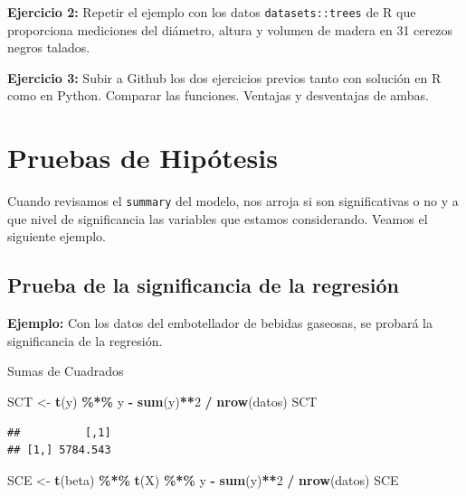 \documentclass[
]{book}
\newenvironment{Shaded}{\begin{snugshade}}{\end{snugshade}}
\newcommand{\DecValTok}[1]{\textcolor[rgb]{0.00,0.00,0.81}{#1}}
\newcommand{\FunctionTok}[1]{\textcolor[rgb]{0.13,0.29,0.53}{\textbf{#1}}}
\newcommand{\NormalTok}[1]{#1}
\newcommand{\OtherTok}[1]{\textcolor[rgb]{0.56,0.35,0.01}{#1}}
\newcommand{\SpecialCharTok}[1]{\textcolor[rgb]{0.81,0.36,0.00}{\textbf{#1}}}
\begin{document}
\textbf{Ejercicio 2:} Repetir el ejemplo con los datos \texttt{datasets::trees} de R que proporciona mediciones
del diámetro, altura y volumen de madera en 31 cerezos negros talados.

\textbf{Ejercicio 3:} Subir a Github los dos ejercicios previos tanto con solución en R como en Python. Comparar las funciones. Ventajas y desventajas de ambas.

\section{Pruebas de Hipótesis}\label{pruebas-de-hipuxf3tesis}

Cuando revisamos el \texttt{summary} del modelo, nos arroja si son significativas o no y a que nivel de significancia las variables que estamos considerando. Veamos el siguiente ejemplo.

\subsection{Prueba de la significancia de la regresión}\label{prueba-de-la-significancia-de-la-regresiuxf3n}

\textbf{Ejemplo:} Con los datos del embotellador de bebidas gaseosas, se probará la significancia de la regresión.

Sumas de Cuadrados

\begin{Shaded}
\begin{Highlighting}[]
\NormalTok{SCT }\OtherTok{\textless{}{-}} \FunctionTok{t}\NormalTok{(y) }\SpecialCharTok{\%*\%}\NormalTok{ y }\SpecialCharTok{{-}}  \FunctionTok{sum}\NormalTok{(y)}\SpecialCharTok{**}\DecValTok{2} \SpecialCharTok{/} \FunctionTok{nrow}\NormalTok{(datos)}
\NormalTok{SCT}
\end{Highlighting}
\end{Shaded}

\begin{verbatim}
##          [,1]
## [1,] 5784.543
\end{verbatim}

\begin{Shaded}
\begin{Highlighting}[]
\NormalTok{SCE }\OtherTok{\textless{}{-}} \FunctionTok{t}\NormalTok{(beta) }\SpecialCharTok{\%*\%} \FunctionTok{t}\NormalTok{(X) }\SpecialCharTok{\%*\%}\NormalTok{ y }\SpecialCharTok{{-}} \FunctionTok{sum}\NormalTok{(y)}\SpecialCharTok{**}\DecValTok{2} \SpecialCharTok{/} \FunctionTok{nrow}\NormalTok{(datos)}
\NormalTok{SCE}
\end{Highlighting}
\end{Shaded}
\end{document}
